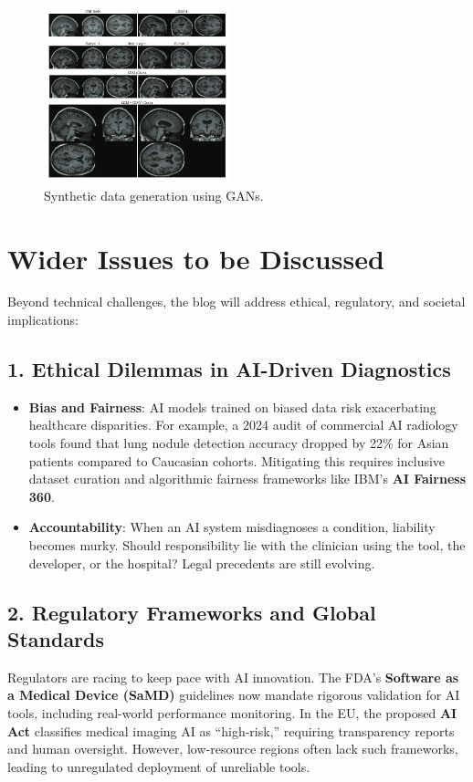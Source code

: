 \documentclass{article}
\begin{document}
\begin{figure}[htb]
    \centering
    \includegraphics[width=0.48\textwidth]{images/generation.png}
    \caption{Synthetic data generation using GANs.}
    \label{fig:generation}
\end{figure}

\section{Wider Issues to be Discussed}

Beyond technical challenges, the blog will address ethical, regulatory, and societal implications:

\subsection*{1. Ethical Dilemmas in AI-Driven Diagnostics}
\begin{itemize}
    \item \textbf{Bias and Fairness}: AI models trained on biased data risk exacerbating healthcare disparities. For example, a 2024 audit of commercial AI radiology tools found that lung nodule detection accuracy dropped by 22\% for Asian patients compared to Caucasian cohorts. Mitigating this requires inclusive dataset curation and algorithmic fairness frameworks like IBM’s \textbf{AI Fairness 360}.
    \item \textbf{Accountability}: When an AI system misdiagnoses a condition, liability becomes murky. Should responsibility lie with the clinician using the tool, the developer, or the hospital? Legal precedents are still evolving.
\end{itemize}

\subsection*{2. Regulatory Frameworks and Global Standards}
Regulators are racing to keep pace with AI innovation. The FDA’s \textbf{Software as a Medical Device (SaMD)} guidelines now mandate rigorous validation for AI tools, including real-world performance monitoring. In the EU, the proposed \textbf{AI Act} classifies medical imaging AI as “high-risk,” requiring transparency reports and human oversight. However, low-resource regions often lack such frameworks, leading to unregulated deployment of unreliable tools.
\end{document}
